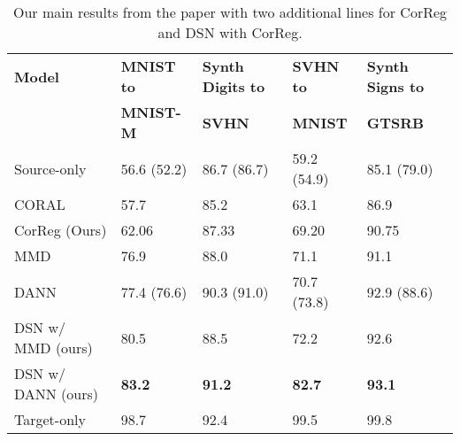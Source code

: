 \documentclass{article}
\begin{document}
\begin{table}[h]
\centering
\caption{Our main results from the paper with two additional lines for CorReg and DSN with CorReg.}
\label{tab:results}
\begin{tabular}{ | l | l | l | l | l | }
\hline
\bf Model   & \bf MNIST to & \bf Synth Digits to &\bf SVHN to  &\bf Synth Signs to \\
 &\bf MNIST-M  &\bf SVHN        &\bf MNIST &\bf GTSRB     \\ \hline \hline
Source-only  & 56.6 (52.2) & 86.7 (86.7)      & 59.2 (54.9) & 85.1  (79.0)    \\ \hline \hline
CORAL \cite{sun2015return} & 57.7 & 85.2       &  63.1     & 86.9        \\ \hline
CorReg (Ours)  & 62.06 & 87.33       & 69.20 & 90.75     \\ \hline\hline
MMD  \cite{tzeng2015ddc,long2015learning}  & 76.9 & 88.0 & 71.1 & 91.1 \\ \hline 
DANN \cite{ganin2016domain}  & 77.4 (76.6)  &  90.3 (91.0)    & 70.7 (73.8)  &     92.9 (88.6) \\ \hline
DSN w/ MMD (ours)  & 80.5 & 88.5  & 72.2   & 92.6 \\ \hline
DSN w/ DANN (ours) & \textbf{83.2} & \textbf{91.2} & \textbf{82.7} & \textbf{93.1} \\ \hline\hline
Target-only  & 98.7 & 92.4  & 99.5 & 99.8  \\ \hline
\end{tabular}
\end{table}
\end{document}
